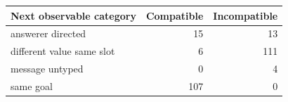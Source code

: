 \begin{tabular}{lrr}
\toprule
Next observable category & Compatible & Incompatible \\
\midrule
answerer directed & 15 & 13 \\
different value same slot & 6 & 111 \\
message untyped & 0 & 4 \\
same goal & 107 & 0 \\
\bottomrule
\end{tabular}